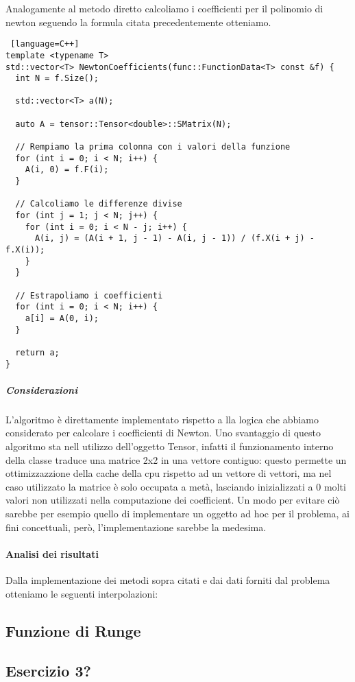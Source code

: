 Analogamente al metodo diretto calcoliamo i coefficienti per il polinomio di
newton seguendo la formula citata precedentemente otteniamo.

\begin{lstlisting} [language=C++]
template <typename T>
std::vector<T> NewtonCoefficients(func::FunctionData<T> const &f) {
  int N = f.Size();

  std::vector<T> a(N);

  auto A = tensor::Tensor<double>::SMatrix(N);

  // Rempiamo la prima colonna con i valori della funzione
  for (int i = 0; i < N; i++) {
    A(i, 0) = f.F(i);
  }

  // Calcoliamo le differenze divise
  for (int j = 1; j < N; j++) {
    for (int i = 0; i < N - j; i++) {
      A(i, j) = (A(i + 1, j - 1) - A(i, j - 1)) / (f.X(i + j) - f.X(i));
    }
  }

  // Estrapoliamo i coefficienti
  for (int i = 0; i < N; i++) {
    a[i] = A(0, i);
  }

  return a;
}
\end{lstlisting}

\subparagraph{Considerazioni} L'algoritmo è direttamente implementato rispetto a
lla logica che abbiamo considerato per calcolare i coefficienti di Newton.
Uno svantaggio di questo algoritmo sta nell utilizzo dell'oggetto Tensor, infatti
il funzionamento interno della classe traduce una matrice 2x2 in una vettore
contiguo: questo permette un ottimizzazzione della cache della cpu rispetto ad un
vettore di vettori, ma nel caso utilizzato la matrice è solo occupata a metà, 
lasciando inizializzati a 0 molti valori non utilizzati nella computazione dei
coefficient.
Un modo per evitare ciò sarebbe per esempio quello di implementare un oggetto ad hoc
per il problema, ai fini concettuali, però, l'implementazione sarebbe la medesima.

\paragraph{Analisi dei risultati}

Dalla implementazione dei metodi sopra citati e dai dati forniti dal problema
otteniamo le seguenti interpolazioni:


\subsection{Funzione di Runge}

\subsection{Esercizio 3?}
